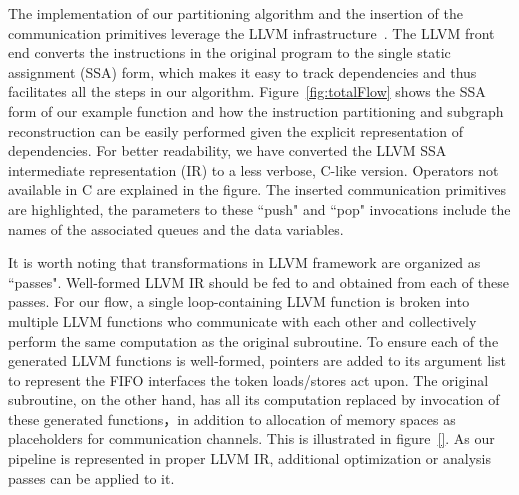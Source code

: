 The implementation of our partitioning algorithm and the insertion of the communication primitives leverage the LLVM infrastructure~\cite{llvmflow}. The LLVM front end converts the instructions in the original program to the single static assignment (SSA) form, which makes it easy to track dependencies and thus facilitates all the steps in our algorithm. Figure~\ref{fig:totalFlow} shows the SSA form
of our example function and how the instruction partitioning and subgraph reconstruction can be easily performed given the explicit representation of
dependencies. For better readability, we have converted the LLVM SSA intermediate representation (IR) to a less verbose, C-like version. Operators not available in C are explained in the figure. The inserted communication primitives are highlighted,
the parameters to these ``push" and ``pop" invocations include the names of the associated queues and the data variables.


It is worth noting that transformations in LLVM framework are organized as ``passes". Well-formed LLVM IR should be fed to and obtained from each of these passes. For our flow, a single loop-containing LLVM function is broken into multiple LLVM functions who communicate with each other and collectively perform the same computation as the original subroutine. To ensure each of the generated
 LLVM functions is well-formed, pointers are added to its argument list to represent the FIFO interfaces the token loads/stores act upon. The original subroutine, on the other hand, has all its computation replaced by invocation of these generated functions，in addition to allocation of memory spaces as placeholders for communication channels. This is illustrated in figure~\ref{}.
 As our pipeline is represented in proper LLVM IR, additional optimization or analysis passes can be applied to it.
 

